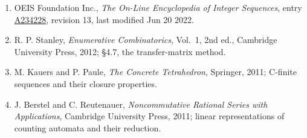 \documentclass[11pt]{article}
\theoremstyle{definition}
\begin{document}
\begin{enumerate}

\item OEIS Foundation Inc., \emph{The On-Line Encyclopedia of Integer Sequences}, entry \href{https://oeis.org/A234228}{A234228}, revision 13, last modified Jun 20 2022.

\item R. P. Stanley, \emph{Enumerative Combinatorics}, Vol.~1, 2nd ed., Cambridge University Press, 2012; \S4.7, the transfer-matrix method.

\item M. Kauers and P. Paule, \emph{The Concrete Tetrahedron}, Springer, 2011; C-finite sequences and their closure properties.

\item J. Berstel and C. Reutenauer, \emph{Noncommutative Rational Series with Applications}, Cambridge University Press, 2011; linear representations of counting automata and their reduction.

\end{enumerate}
\end{document}
